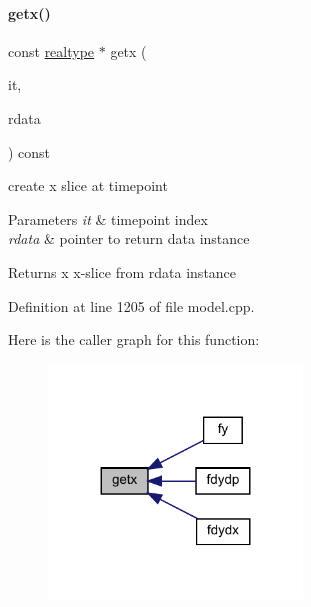 \paragraph{\texorpdfstring{getx()}{getx()}}
{\footnotesize\ttfamily const \mbox{\hyperlink{namespaceamici_a1bdce28051d6a53868f7ccbf5f2c14a3}{realtype}} $\ast$ getx (\begin{DoxyParamCaption}\item[{const int}]{it,  }\item[{const \mbox{\hyperlink{classamici_1_1_return_data}{Return\+Data}} $\ast$}]{rdata }\end{DoxyParamCaption}) const\hspace{0.3cm}{\ttfamily [protected]}}

create x slice at timepoint 
\begin{DoxyParams}{Parameters}
{\em it} & timepoint index \\
\hline
{\em rdata} & pointer to return data instance \\
\hline
\end{DoxyParams}
\begin{DoxyReturn}{Returns}
x x-\/slice from rdata instance 
\end{DoxyReturn}


Definition at line 1205 of file model.\+cpp.

Here is the caller graph for this function\+:
\nopagebreak
\begin{figure}[H]
\begin{center}
\leavevmode
\includegraphics[width=191pt]{classamici_1_1_model_abefad4b8b4ba76bad66f57504affca9b_icgraph}
\end{center}
\end{figure}
\mbox{\label{classamici_1_1_model_ae808a142aab292ef1b424bc3a0d924a0}} 
